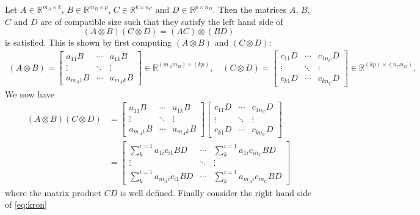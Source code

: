Let $A\in \mathbb{R}^{m_{A}\times k}$, $B\in \mathbb{R}^{m_B\times p}$, $C\in \mathbb{R}^{k\times n_{C}}$ and $D\in \mathbb{R}^{p\times n_{D}}$. Then the matrices $A$, $B$, $C$ and $D$ are of  compatible size such that they satisfy the left hand side of
\begin{equation}
  \label{eq:kron}
  (A\otimes B)(C\otimes D) = (AC)\otimes (BD)
\end{equation}
is satisfied. This is shown by first computing $  (A\otimes B)$ and $  (C\otimes D)$:
\begin{align*}
  (A\otimes B) = \begin{bmatrix}
a_{11}B & \cdots & a_{1k}B\\
\vdots & \ddots & \vdots\\
a_{m_{A}1}B & \cdots & a_{m_{A}k}B
\end{bmatrix}
\in \mathbb{R}^{(m_{A}m_{B})\times (kp)},\quad (C\otimes D) = \begin{bmatrix}
c_{11}D & \cdots & c_{1n_{C}}D\\
\vdots & \ddots & \vdots\\
c_{k1}D & \cdots & c_{kn_{C}}D
\end{bmatrix}
\in \mathbb{R}^{(kp)\times (n_{C}n_{D})}.
\end{align*}
We now have
\begin{align*}
  (A\otimes B)(C\otimes D) &= \begin{bmatrix}
a_{11}B & \cdots & a_{1k}B\\
\vdots & \ddots & \vdots\\
a_{m_{A}1}B & \cdots & a_{m_{A}k}B
\end{bmatrix}
\begin{bmatrix}
c_{11}D & \cdots & c_{1n_{C}}D\\
\vdots & \ddots & \vdots\\
c_{k1}D & \cdots & c_{kn_{C}}D
\end{bmatrix}\\
 &= \begin{bmatrix}
\sum\limits_{k}^{i = 1}a_{1i}c_{i1}BD & \cdots & \sum\limits_{k}^{i = 1}a_{1i}c_{in_{C}}BD\\
\vdots & \ddots & \vdots\\
\sum\limits_{k}^{i = 1}a_{m_{A}i}c_{i1}BD & \cdots & \sum\limits_{k}^{i = 1}a_{m_{A}i}c_{in_{C}}BD
\end{bmatrix}
\end{align*}
where the matrix product $CD$ is well defined. Finally consider the right hand side of \eqref{eq:kron}

